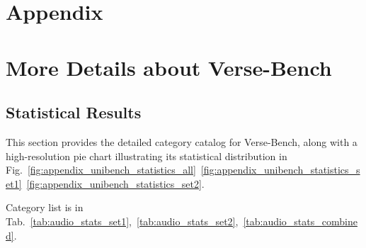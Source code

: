 \appendix
\section*{Appendix}
\section{More Details about Verse-Bench}
\subsection{Statistical Results}
\label{lab:verse-bench-fig}
This section provides the detailed category catalog for Verse-Bench, along with a high-resolution pie chart illustrating its statistical distribution in Fig.~\ref{fig:appendix_unibench_statistics_all}~\ref{fig:appendix_unibench_statistics_set1}~\ref{fig:appendix_unibench_statistics_set2}.

Category list is in Tab.~\ref{tab:audio_stats_set1},~\ref{tab:audio_stats_set2},~\ref{tab:audio_stats_combined}.

